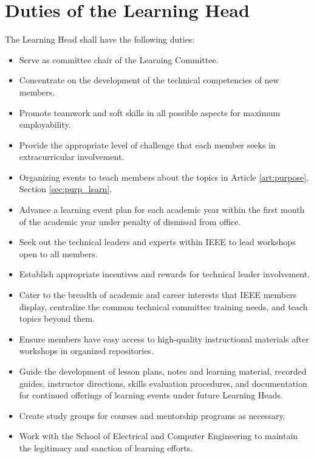 \documentclass[12pt]{constitution}
\begin{document}
\section{Duties of the Learning Head}
\label{sec:officer_learn}
The Learning Head shall have the following duties:
\begin{itemize}
    \item Serve as committee chair of the Learning Committee.
    \item Concentrate on the development of the technical competencies of new members.
    \item Promote teamwork and soft skills in all possible aspects for maximum employability.
    \item Provide the appropriate level of challenge that each member seeks in extracurricular involvement.
    \item Organizing events to teach members about the topics in Article \ref{art:purpose}, Section \ref{sec:purp_learn}.
    \item Advance a learning event plan for each academic year within the first month of the academic year under penalty of dismissal from office.
    \item Seek out the technical leaders and experts within IEEE to lead workshops open to all members.
    \item Establish appropriate incentives and rewards for technical leader involvement.
    \item Cater to the breadth of academic and career interests that IEEE members display, centralize the common technical committee training needs, and teach topics beyond them.
    \item Ensure members have easy access to high-quality instructional materials after workshops in organized repositories.
    \item Guide the development of lesson plans, notes and learning material, recorded guides, instructor directions, skills evaluation procedures, and documentation for continued offerings of learning events under future Learning Heads.
    \item Create study groups for courses and mentorship programs as necessary.
    \item Work with the School of Electrical and Computer Engineering to maintain the legitimacy and sanction of learning efforts.
\end{itemize}
\end{document}
